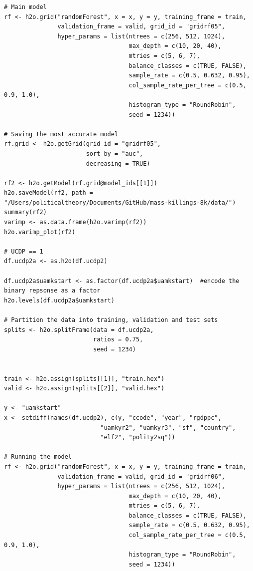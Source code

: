 \begin{verbatim}
# Main model
rf <- h2o.grid("randomForest", x = x, y = y, training_frame = train, 
               validation_frame = valid, grid_id = "gridrf05",
               hyper_params = list(ntrees = c(256, 512, 1024),
                                   max_depth = c(10, 20, 40),
                                   mtries = c(5, 6, 7),
                                   balance_classes = c(TRUE, FALSE),
                                   sample_rate = c(0.5, 0.632, 0.95),
                                   col_sample_rate_per_tree = c(0.5, 0.9, 1.0),
                                   histogram_type = "RoundRobin",
                                   seed = 1234)) 

# Saving the most accurate model
rf.grid <- h2o.getGrid(grid_id = "gridrf05",
                       sort_by = "auc",
                       decreasing = TRUE)

rf2 <- h2o.getModel(rf.grid@model_ids[[1]])
h2o.saveModel(rf2, path = "/Users/politicaltheory/Documents/GitHub/mass-killings-8k/data/")
summary(rf2)
varimp <- as.data.frame(h2o.varimp(rf2))
h2o.varimp_plot(rf2)

# UCDP == 1
df.ucdp2a <- as.h2o(df.ucdp2)

df.ucdp2a$uamkstart <- as.factor(df.ucdp2a$uamkstart)  #encode the binary repsonse as a factor
h2o.levels(df.ucdp2a$uamkstart)

# Partition the data into training, validation and test sets
splits <- h2o.splitFrame(data = df.ucdp2a, 
                         ratios = 0.75, 
                         seed = 1234) 


train <- h2o.assign(splits[[1]], "train.hex")   
valid <- h2o.assign(splits[[2]], "valid.hex") 

y <- "uamkstart"
x <- setdiff(names(df.ucdp2), c(y, "ccode", "year", "rgdppc",
                           "uamkyr2", "uamkyr3", "sf", "country",
                           "elf2", "polity2sq")) 

# Running the model
rf <- h2o.grid("randomForest", x = x, y = y, training_frame = train, 
               validation_frame = valid, grid_id = "gridrf06",
               hyper_params = list(ntrees = c(256, 512, 1024),
                                   max_depth = c(10, 20, 40),
                                   mtries = c(5, 6, 7),
                                   balance_classes = c(TRUE, FALSE),
                                   sample_rate = c(0.5, 0.632, 0.95),
                                   col_sample_rate_per_tree = c(0.5, 0.9, 1.0),
                                   histogram_type = "RoundRobin",
                                   seed = 1234)) 


\end{verbatim}
